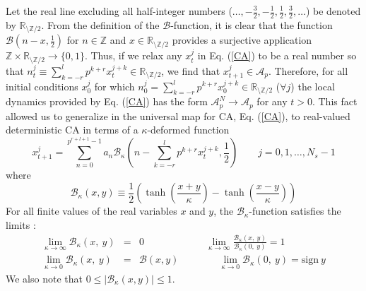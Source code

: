 \documentclass[aps,pre,preprint,floatfix]{revtex4}
\theoremstyle{plain} \newtheorem{defi}{Definition}[section]
\theoremstyle{plain} \newtheorem{prop}{Proposition}[section]
\theoremstyle{plain} \newtheorem{theor}{Theorem}[section]
\theoremstyle{plain} \newtheorem{lemma}{Lemma}[section]
\theoremstyle{plain} \newtheorem*{corol}{Corollary}
\theoremstyle{remark} \newtheorem*{rem}{Remark}
\theoremstyle{plain} \newtheorem{exer}{Exercise}[section]
\theoremstyle{remark} \newtheorem*{ans}{Answer}
\begin{document}
Let the real line excluding all half-integer numbers ($\ldots, -\frac{3}{2}, -\frac{1}{2}, \frac{1}{2}, \frac{3}{2},\ldots$) be denoted by $\mathbb{R}_{\setminus \mathbb{Z}/2}$. From the definition of the $\mathcal{B}$-function, it is clear that the function $\mathcal{B}\left(n-x,\frac{1}{2} \right)$ for $n\in \mathbb{Z}$ and $x\in \mathbb{R}_{\setminus \mathbb{Z}/2}$ provides a surjective application $\mathbb{Z}\times\mathbb{R}_{\setminus \mathbb{Z}/2} \to \{0,1\}$. Thus, if we relax any $x_t^j$ in Eq. (\ref{CA}) to be a real number so that $n_t^j\equiv \sum_{k=-r}^{l}p^{k+r}x_{t}^{j+k}\in  \mathbb{R}_{\setminus \mathbb{Z}/2}$, we find that $x_{t+1}^j\in \mathcal{A}_{p}$. Therefore, for all initial conditions $x_0^j$ for which $n_0^j= \sum_{k=-r}^{l}p^{k+r}x_{0}^{j+k} \in \mathbb{R}_{\setminus \mathbb{Z}/2}$ ($\forall j$) the local dynamics provided by Eq. (\ref{CA}) has the form $\mathcal{A}_{p}^{N}\to \mathcal{A}_{p}$ for any $t>0$. This fact allowed us to generalize in \cite{JPHYSA}  the universal map for CA, Eq. (\ref{CA}), to real-valued deterministic CA in terms of a $\kappa$-deformed function
\begin{equation}
x_{t+1}^{j}=\sum_{n=0}^{p^{r+l+1}-1}a_{n}\mathcal{B}_{\kappa}\left(n-\sum_{k=-r}^{l}p^{k+r}x_{t}^{j+k},\frac{1}{2}\right) \qquad j=0,1,\ldots, N_{s}-1 \label{RDCA}
\end{equation} 
where
\begin{equation}
\mathcal{B}_{\kappa}(x,y)\equiv \frac{1}{2}\left( 
\tanh\left(\frac{x+y}{\kappa} \right)-\tanh\left(\frac{x-y}{\kappa} \right)
\right) \label{bkappa}
\end{equation}
For all finite values of the real variables $x$ and $y$, the $\mathcal{B}_{\kappa}$-function satisfies the limits \cite{JPHYSA}:
\begin{eqnarray}
\lim_{\kappa \to \infty}\mathcal{B}_{\kappa}\left(x,\ y\right)&=& 0 \qquad  \qquad \qquad \
\lim_{\kappa \to \infty}\frac{\mathcal{B}_{\kappa}\left(x,\ y\right)}{\mathcal{B}_{\kappa}\left(0,\ y\right)}=1 \label{lim1} \\
\lim_{\kappa \to 0}\mathcal{B}_{\kappa}\left(x,\ y\right)&=& \mathcal{B}(x,y) \label{lim2} \qquad  \qquad \lim_{\kappa \to 0}\mathcal{B}_{\kappa}\left(0,\ y\right)= \text{sign}\ y
\end{eqnarray}
We also note that $0\le \left|\mathcal{B}_{\kappa}(x,y)\right| \le 1$.
\end{document}
